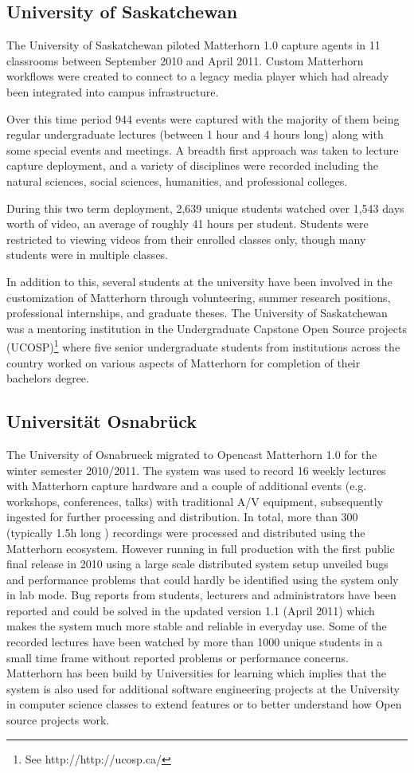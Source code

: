 \documentclass{sig-alternate}
\begin{document}
\subsection{University of Saskatchewan}
The University of Saskatchewan piloted Matterhorn 1.0 capture agents in 11 classrooms between September 2010 and April 2011.  Custom Matterhorn workflows were created to connect to a legacy media player which had already been integrated into campus infrastructure.

Over this time period 944 events were captured with the majority of them being regular undergraduate lectures (between 1 hour and 4 hours long) along with some special events and meetings.  A breadth first approach was taken to lecture capture deployment, and a variety of disciplines were recorded including the natural sciences, social sciences, humanities, and professional colleges.

During this two term deployment, 2,639 unique students watched over 1,543 days worth of video, an average of roughly 41 hours per student.  Students were restricted to viewing videos from their enrolled classes only, though many students were in multiple classes.

In addition to this, several students at the university have been involved in the customization of Matterhorn through volunteering, summer research positions, professional internships, and graduate theses.  The University of Saskatchewan was a mentoring institution in the Undergraduate Capstone Open Source projects (UCOSP)\footnote{See http://http://ucosp.ca/} where five senior undergraduate students from institutions across the country worked on various aspects of Matterhorn for completion of their bachelors degree.

\subsection{Universit\"{a}t Osnabr\"{u}ck}
The University of Osnabrueck migrated to Opencast Matterhorn 1.0 for the winter semester 2010/2011. The system was used to record 16 weekly lectures with Matterhorn capture hardware and a couple of additional events (e.g. workshops, conferences, talks) with traditional A/V equipment, subsequently ingested for further processing and distribution. In total, more than 300 (typically 1.5h long ) recordings were processed and distributed using the Matterhorn ecosystem. However running in full production with the first public final release in 2010 using a large scale distributed system setup unveiled bugs and performance problems that could hardly be identified using the system only in lab mode. Bug reports from students, lecturers and administrators have been reported and could be solved in the updated version 1.1 (April 2011) which makes the system much more stable and reliable in everyday use.
Some of the recorded lectures have been watched by more than 1000 unique students in a small time frame without reported problems or performance concerns.
Matterhorn has been build by Universities for learning which implies that the system is also used for additional software engineering projects at the University in computer science classes to extend features or to better understand how Open source projects work.
\end{document}
